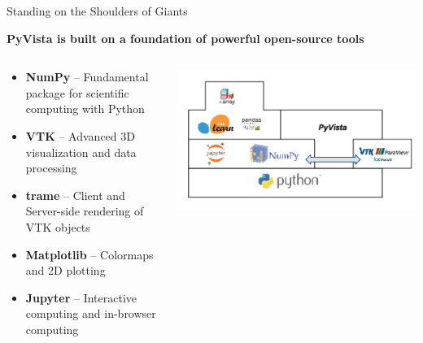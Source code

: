 \documentclass[t]{beamer}
\begin{document}
\begin{frame}{Standing on the Shoulders of Giants}

    \centering
    \textbf{\Large PyVista is built on a foundation of powerful open-source tools}

    \vspace{20pt}

    \begin{columns}[c]
        \begin{column}{0.5\textwidth}
            \begin{itemize}[leftmargin=10pt, label=•]
                \item \textbf{NumPy} – Fundamental package for scientific computing with Python
                \item \textbf{VTK} – Advanced 3D visualization and data processing
                \item \textbf{trame} – Client and Server-side rendering of VTK objects
                \item \textbf{Matplotlib} – Colormaps and 2D plotting
                \item \textbf{Jupyter} – Interactive computing and in-browser computing
            \end{itemize}
        \end{column}

        \begin{column}{0.5\textwidth}
            \centering
            \includegraphics[width=1.0\textwidth]{figures/pyvista_dependencies_trans.png}
        \end{column}
    \end{columns}


\end{frame}
\end{document}
